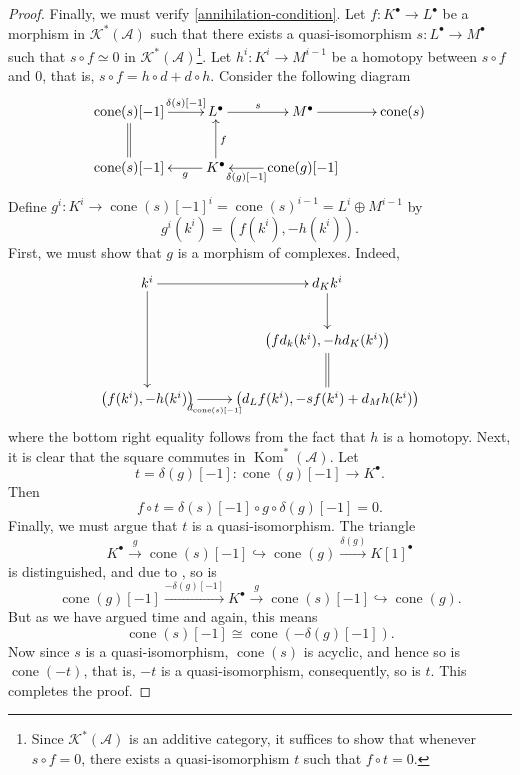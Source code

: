 \documentclass[11pt]{article}
\theoremstyle{thmstyle}
\theoremstyle{defstyle}
\newcommand{\scrA}{\mathscr{A}}
\newcommand{\into}{\hookrightarrow}
\newcommand{\Kom}{\operatorname{Kom}}
\newcommand{\scrK}{\mathscr{K}}
\newcommand{\cone}{\operatorname{cone}}
\begin{document}
\begin{proof}
	Finally, we must verify \ref{annihilation-condition}. Let $f\colon K^\bullet\to L^\bullet$ be a morphism in $\scrK^\ast(\scrA)$ such that there exists a quasi-isomorphism $s\colon L^\bullet\to M^\bullet$ such that $s\circ f \simeq 0$ in $\scrK^\ast(\scrA)$\footnote{Since $\scrK^\ast(\scrA)$ is an additive category, it suffices to show that whenever $s\circ f = 0$, there exists a quasi-isomorphism $t$ such that $f\circ t = 0$.}. Let $h^i\colon K^i\to M^{i - 1}$ be a homotopy between $s\circ f$ and $0$, that is, $s\circ f = h\circ d + d\circ h$. Consider the following diagram 
	\begin{equation*}
		\xymatrix {
			\cone(s)[-1]\ar[r]^-{\delta(s)[-1]}\ar@{=}[d] & L^\bullet\ar[r]^-s & M^\bullet\ar[r] & \cone(s)\\
			\cone(s)[-1] & K^\bullet\ar[l]^-g\ar[u]_f & \cone(g)[-1]\ar[l]^-{\delta(g)[-1]}
		}
	\end{equation*}
	Define $g^i\colon K^i\to\cone(s)[-1]^i = \cone(s)^{i - 1} = L^i\oplus M^{i - 1}$ by 
	\begin{equation*}
		g^i\left(k^i\right) = \left(f(k^i), -h(k^i)\right).
	\end{equation*}
	First, we must show that $g$ is a morphism of complexes. Indeed, 
	\begin{equation*}
		\xymatrix {
			k^i\ar[r]\ar[dd] & d_K k^i\ar[d]\\
			& \left(f d_k(k^i), -h d_K(k^i)\right)\ar@{=}[d]\\
			\left(f(k^i), -h(k^i)\right)\ar[r]_-{d_{\cone(s)[-1]}} & \left(d_L f(k^i), -sf(k^i) + d_M h(k^i)\right)
		}
	\end{equation*}
	where the bottom right equality follows from the fact that $h$ is a homotopy. Next, it is clear that the square commutes in $\Kom^\ast(\scrA)$. Let 
	\begin{equation*}
		t = \delta(g)[-1]\colon \cone(g)[-1]\to K^\bullet.
	\end{equation*}
	Then 
	\begin{equation*}
		f\circ t = \delta(s)[-1]\circ g\circ \delta(g)[-1] = 0.
	\end{equation*}
	Finally, we must argue that $t$ is a quasi-isomorphism. The triangle 
	\begin{equation*}
		K^\bullet\xrightarrow{g}\cone(s)[-1]\into\cone(g)\xrightarrow{\delta(g)} K[1]^\bullet
	\end{equation*}
	is distinguished, and due to , so is 
	\begin{equation*}
		\cone(g)[-1]\xrightarrow{-\delta(g)[-1]} K^\bullet\xrightarrow{g}\cone(s)[-1]\into\cone(g).
	\end{equation*}
	But as we have argued time and again, this means 
	\begin{equation*}
		\cone(s)[-1]\cong\cone\left(-\delta(g)[-1]\right).
	\end{equation*}
	Now since $s$ is a quasi-isomorphism, $\cone(s)$ is acyclic, and hence so is $\cone(-t)$, that is, $-t$ is a quasi-isomorphism, consequently, so is $t$. This completes the proof.
\end{proof}
\end{document}
